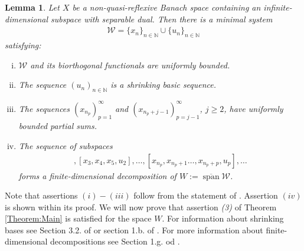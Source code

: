 \documentclass{amsart}
\newtheorem{lemma}[theorem]{Lemma}
\theoremstyle{definition}
\begin{document}
\begin{lemma} \cite[Lemma 2]{Ostrovskii2011} \label{Lemma:BiorthogonalSystem}
    Let $X$ be a non-quasi-reflexive Banach space containing an infinite-dimensional subspace with separable dual. Then there is a minimal system
    \begin{align*}
        \mathcal{W} = \{x_n\}_{n\in \mathbb{N}} \cup \{u_n\}_{n\in \mathbb{N}}
    \end{align*}
    satisfying:
    \begin{enumerate}[(i)]
        \item $\mathcal{W}$ and its biorthogonal functionals are uniformly bounded.
        \item The sequence $(u_n)_{n \in \mathbb{N}}$ is a shrinking basic sequence.
        \item The sequences $(x_{n_p})_{p=1}^\infty$ and $(x_{n_p+j-1})_{p = j-1}^\infty$, $j \geq 2$, have uniformly bounded partial sums.
        \item The sequence of subspaces
            \begin{align*}
                [x_1,x_2,u_1], [x_3,x_4,x_5,u_2], \dots, [x_{n_p},x_{n_p+1}\dots,x_{n_p+p},u_p],\dots
            \end{align*}
            forms a finite-dimensional decomposition of $W := \overline{\operatorname{span}} \mathcal{W}$.
    \end{enumerate}
\end{lemma}

Note that assertions $(i)-(iii)$ follow from the statement of \cite[Lemma 2]{Ostrovskii2011}. Assertion $(iv)$ is shown within its proof. We will now prove that assertion \textit{(3)} of Theorem \ref{Theorem:Main} is satisfied for the space $W$. For information about shrinking bases see Section 3.2. of \cite{nigel2006topics} or section 1.b. of \cite{LindenstraussTzafririClassicalBSI}. For more information about finite-dimensional decompositions see Section 1.g. od \cite{LindenstraussTzafririClassicalBSI}.
\end{document}
